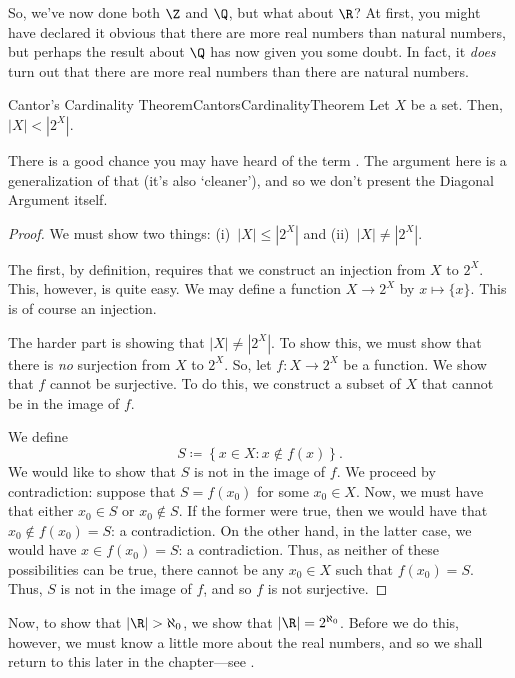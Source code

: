 So, we've now done both $\Z$ and $\Q$, but what about $\R$?  At first, you might have declared it obvious that there are more real numbers than natural numbers, but perhaps the result about $\Q$ has now given you some doubt.  In fact, it \emph{does} turn out that there are more real numbers than there are natural numbers.
\begin{thm}{Cantor's Cardinality Theorem}{CantorsCardinalityTheorem}
Let $X$ be a set.  Then, $|X|<|2^X|$.
\begin{rmk}
There is a good chance you may have heard of the term .  The argument here is a generalization of that (it's also `cleaner'), and so we don't present the Diagonal Argument itself.
\end{rmk}
\begin{proof}
We must show two things:  (i)~$|X|\leq |2^X|$ and (ii)~$|X|\neq |2^X|$.

The first, by definition, requires that we construct an injection from $X$ to $2^X$.  This, however, is quite easy.  We may define a function $X\rightarrow 2^X$ by $x\mapsto \{ x\}$.  This is of course an injection.

The harder part is showing that $|X|\neq |2^X|$.  To show this, we must show that there is \emph{no} surjection from $X$ to $2^X$.  So, let $f\colon X\rightarrow 2^X$ be a function.  We show that $f$ cannot be surjective.  To do this, we construct a subset of $X$ that cannot be in the image of $f$.

We define
\begin{equation}
S\coloneqq \left\{ x\in X:x\notin f(x)\right\} .
\end{equation}
We would like to show that $S$ is not in the image of $f$.  We proceed by contradiction:  suppose that $S=f(x_0)$ for some $x_0\in X$.  Now, we must have that either $x_0\in S$ or $x_0\notin S$.  If the former were true, then we would have that $x_0\notin f(x_0)=S$:  a contradiction.  On the other hand, in the latter case, we would have $x\in f(x_0)=S$:  a contradiction.  Thus, as neither of these possibilities can be true, there cannot be any $x_0\in X$ such that $f(x_0)=S$.  Thus, $S$ is not in the image of $f$, and so $f$ is not surjective.
\end{proof}
\end{thm}
Now, to show that $|\R |>\aleph _0$, we show that $|\R |=2^{\aleph _0}$.  Before we do this, however, we must know a little more about the real numbers, and so we shall return to this later in the chapter---see .

